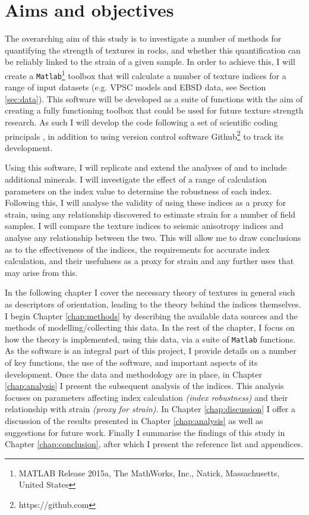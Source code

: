 \documentclass[a4paper,12pt,twoside]{report}
\numberwithin{equation}{chapter}
\begin{document}
\section{Aims and objectives} \label{sec:aims+objs}
	
The overarching aim of this study is to investigate a number of methods for quantifying the strength of textures in rocks, and whether this quantification can be reliably linked to the strain of a given sample. In order to achieve this, I will create a \texttt{Matlab}\footnote{MATLAB Release 2015a, The MathWorks, Inc., Natick, Massachusetts, United States} toolbox that will calculate a number of texture indices for a range of input datasets (e.g. VPSC models and EBSD data, see Section \ref{sec:data}). This software will be developed as a suite of functions with the aim of creating a fully functioning toolbox that could be used for future texture strength research. As such I will develop the code following a set of scientific coding principals \citep{Wilson2014}, in addition to using version control software Github\footnote{https://github.com} to track its development.   

Using this software, I will replicate and extend the analyses of \cite{Skemer} and \cite{Mainprice} to include additional minerals. I will investigate the effect of a range of calculation parameters on the index value to determine the robustness of each index. Following this, I will analyse the validity of using these indices as a proxy for strain, using any relationship discovered to estimate strain for a number of field samples. I will compare the texture indices to seismic anisotropy indices and analyse any relationship between the two. This will allow me to draw conclusions as to the effectiveness of the indices, the requirements for accurate index calculation, and their usefulness as a proxy for strain and any further uses that may arise from this.  

In the following chapter I cover the necessary theory of textures in general such as descriptors of orientation, leading to the theory behind the indices themselves. I begin Chapter \ref{chap:methods} by describing the available data sources and the methods of modelling/collecting this data. In the rest of the chapter, I focus on how the theory is implemented, using this data, via a suite of \texttt{Matlab} functions. As the software is an integral part of this project, I provide details on a number of key functions, the use of the software, and important aspects of its development. Once the data and methodology are in place, in Chapter \ref{chap:analysis} I present the subsequent analysis of the indices. This analysis focuses on parameters affecting index calculation \emph{(index robustness)} and their relationship with strain \emph{(proxy for strain)}. In Chapter \ref{chap:discussion} I offer a discussion of the results presented in Chapter \ref{chap:analysis} as well as suggestions for future work. Finally I summarise the findings of this study in Chapter \ref{chap:conclusion}, after which I present the reference list and appendices.   
\end{document}
